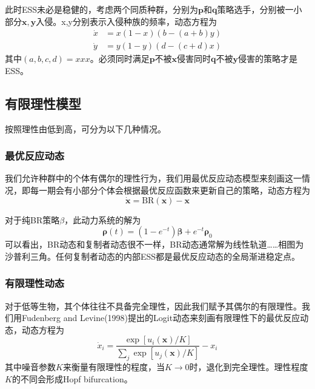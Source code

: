 \documentclass[lang=cn,12pt,a4paper]{elegantpaper}
\begin{document}
此时ESS未必是稳健的，考虑两个同质种群，分别为$\mathbf{p}$和$\mathbf{q}$策略选手，分别被一小部分$\mathbf{x},\mathbf{y}$入侵。x,y分别表示入侵种族的频率，动态方程为
\begin{equation}
\begin{aligned}
\dot{x} &=x(1-x)(b-(a+b) y) \\
\dot{y} &=y(1-y)(d-(c+d) x)
\end{aligned}
\end{equation}
其中\((a,b,c,d)=xxx\)。必须同时满足$\mathbf{p}$不被$\mathbf{x}$侵害同时$\mathbf{q}$不被$\mathbf{y}$侵害的策略才是ESS。

\subsection{有限理性模型}

按照理性由低到高，可分为以下几种情况。

\subsubsection{最优反应动态}

我们允许种群中的个体有偶尔的理性行为，我们用最优反应动态模型来刻画这一情况，即每一期会有小部分个体会根据最优反应函数来更新自己的策略，动态方程为
\begin{equation}
\dot{\mathbf{x}}=\mathrm{BR}(\mathbf{x})-\mathbf{x}
\end{equation}

对于纯BR策略\(\beta\)，此动力系统的解为
\begin{equation}
    \boldsymbol{\rho}(t)=\left(1-e^{-t}\right) \boldsymbol{\beta}+e^{-t} \boldsymbol{\rho}_{0}
\end{equation}
可以看出，BR动态和复制者动态很不一样，BR动态通常解为线性轨道……相图为沙普利三角。任何复制者动态的内部ESS都是最优反应动态的全局渐进稳定点。

\subsubsection{有限理性动态}

对于低等生物，其个体往往不具备完全理性，因此我们赋予其偶尔的有限理性。我们用Fudenberg and Levine(1998)提出的Logit动态来刻画有限理性下的最优反应动态，动态方程为
\begin{equation}
\dot{{x}}_{i}=\frac{\exp \left[u_{i}(\mathbf{x}) / K\right]}{\sum_{j} \exp \left[u_{j}(\mathbf{x}) / K\right]}-{x}_i
\end{equation}
其中噪音参数$K$来衡量有限理性的程度，当$K\rightarrow0$时，退化到完全理性。理性程度\(K\)的不同会形成Hopf bifurcation。
\end{document}
